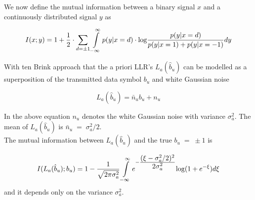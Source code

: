 We now define the mutual information between a binary signal $x$ and a continuously distributed signal $y$ as

\small
\begin{equation}
I(x;y)=1+\frac{\hbox{$1$}}{\hbox{$2$}}\cdot \sum\limits_{d=\pm 1}\int\limits_{-\infty}^{\infty}p(y\vert x = d)\cdot \mathrm{log}\frac{\hbox{$p(y\vert x=d)$}}{\hbox{$p(y\vert x=1)+p(y\vert x=-1)$}}dy
\end{equation}
\normalsize

With ten Brink approach that the a priori LLR's $L_a(\hat{b}_u)$ can be modelled as a superposition of the transmitted data symbol $b_u$ and white Gaussian noise

\begin{equation}
L_a(\hat{b}_u)=\bar{n}_ub_u+n_u
\end{equation}

In the above equation $n_u$ denotes the white Gaussian noise with variance $\sigma_a^2$. The mean of $L_a(\hat{b}_u)$ is $\bar{n}_u\;=\;\sigma_a^2/2$. \\

The mutual information between $L_a(\hat{b}_u)$ and the true $b_u\;=\;\pm 1$ is

\begin{equation}
I(L_a(\hat{b}_u);b_u)=1-\frac{\hbox{$1$}}{\hbox{$\sqrt{2\pi \sigma^2_a}$}}\int\limits_{-\infty}^{\infty}e^{-\frac{\hbox{$(\xi-\sigma_a^2/2)^2$}}{\hbox{$2\sigma_a^2$}}}\mathrm{log}(1+e^{-\xi})d\xi
\end{equation}
and it depends only on the variance $\sigma_a^2$.\\

